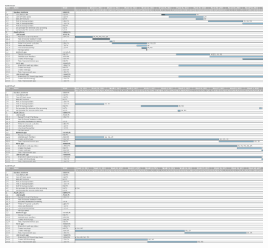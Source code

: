 \documentclass[12pt]{article}
\begin{document}
\begin{figure}[h]
	\includegraphics[width=\textwidth]{gantt1.png}
	\\
	\includegraphics[width=\textwidth]{gantt2.png}
	\\
	\includegraphics[width=\textwidth]{gantt3.png}
\end{figure}
\end{document}
